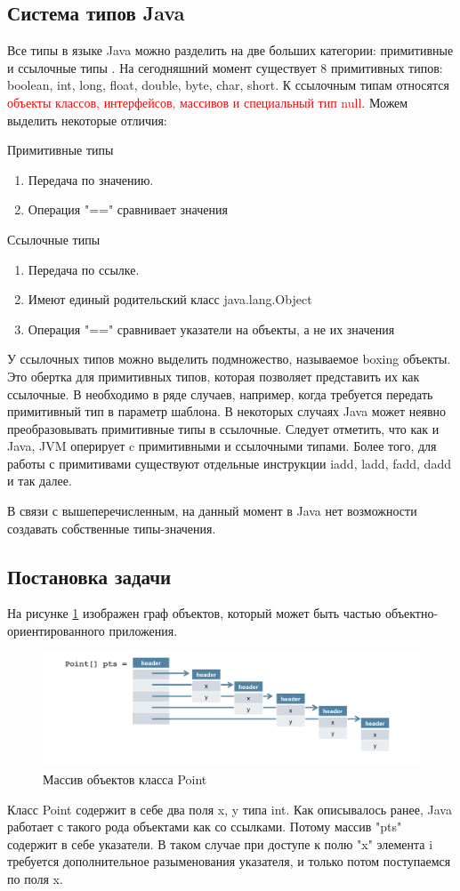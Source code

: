 \subsection{Система типов Java}
Все типы в языке Java можно разделить на две больших категории: примитивные и ссылочные типы \cite{java-spec}. На сегодняшний момент существует 8 примитивных типов: boolean, int,
long, float, double, byte, char, short. К ссылочным типам относятся \textcolor{red}{объекты классов, интерфейсов, массивов и специальный тип null}. Можем выделить некоторые отличия:
\par
Примитивные типы
\begin{enumerate}
	\item Передача по значению.
	\item Операция "==" сравнивает значения 
\end{enumerate}
Ссылочные типы
\begin{enumerate}
	\item Передача по ссылке.
	\item Имеют единый родительский класс java.lang.Object
	\item Операция "==" сравнивает указатели на объекты, а не их значения
\end{enumerate}
У ссылочных типов можно выделить подмножество, называемое boxing объекты. Это обертка для примитивных типов, которая позволяет представить их как ссылочные. В необходимо в ряде случаев, например, когда требуется передать примитивный тип в параметр шаблона. В некоторых случаях Java может неявно преобразовывать примитивные типы в ссылочные.
Следует отметить, что как и Java, JVM оперирует c примитивными и ссылочными типами\cite{jvm-spec}. Более того, для работы с примитивами существуют отдельные инструкции iadd, ladd, fadd, dadd и так далее.
\par
В связи с вышеперечисленным, на данный момент в Java нет возможности создавать собственные типы-значения.

\subsection{Постановка задачи}
На рисунке \ref{ref-graph}  изображен граф объектов, который может быть частью объектно-ориентированного приложения.
\begin{figure}[h]
	\caption{Массив объектов класса Point}\label{ref-graph}
	\includegraphics[width=0.95\linewidth]{image/reference.png}
\end{figure}
Класс Point содержит в себе два поля x, y типа int. Как описывалось ранее, Java работает с 
такого рода объектами как со ссылками. Потому массив "pts" содержит в себе указатели. В таком случае при доступе к полю "x" элемента i требуется дополнительное разыменования указателя, и только потом поступаемся по поля x.

